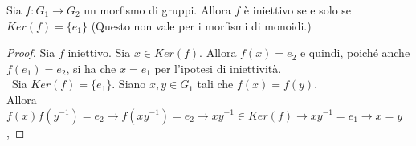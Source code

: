 \documentclass[../main.tex]{subfiles}
\begin{document}
\begin{theorem}
    Sia $f : G_1 \rightarrow G_2$ un morfismo di gruppi. Allora $f$ è iniettivo se e solo se $Ker(f) = \{e_1\}$ (Questo non vale per i morfismi di monoidi.)
\end{theorem}

\begin{proof}
    Sia $f$ iniettivo. Sia $x \in Ker(f)$. Allora $f(x) = e_2$ e quindi, poiché anche $f(e_1) = e_2$, si ha che $x = e_1$
    per l'ipotesi di iniettività.\\\
    Sia $Ker(f) = \{e_1\}$. Siano $x,y \in G_1$ tali che $f(x) = f(y)$.\\
    Allora $f(x)f(y^{-1}) = e_2 \rightarrow  f(xy^{-1}) = e_2 \rightarrow  xy^{-1} \in Ker(f) \rightarrow xy^{-1} = e_1 \rightarrow
        x=y$,
\end{proof}
\end{document}
